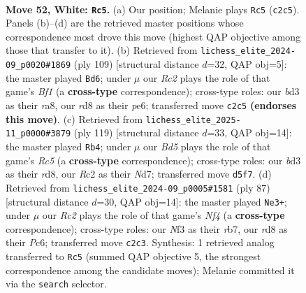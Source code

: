 \documentclass[11pt]{article}
\begin{document}
\clearpage

\begin{figure}[p]\centering
\begin{subfigure}{0.46\textwidth}\centering
\resizebox{\linewidth}{!}{%
\newchessgame
\chessboard[
  setfen={3r4/k7/8/3B1p1N/1P6/3b1N2/2R3P1/2K5 w - - 0 52},
  showmover=false,
  pgfstyle=straightmove, color=movearrow, markmove={c2-c5}
]}
\caption{}
\end{subfigure}\hfill
\begin{subfigure}{0.46\textwidth}\centering
\resizebox{\linewidth}{!}{%
\newchessgame
\chessboard[
  setfen={R4b2/2p3k1/4P3/3p4/4p1K1/3n4/8/8 b - - 0 55},
  showmover=false,
  pgfstyle=straightmove, color=movearrow, markmove={f8-d6}
]}
\caption{}
\end{subfigure}
\\[4pt]
\begin{subfigure}{0.46\textwidth}\centering
\resizebox{\linewidth}{!}{%
\newchessgame
\chessboard[
  setfen={3R4/3n3p/2k5/5P2/p1r3P1/4B2P/8/6K1 b - - 0 60},
  showmover=false,
  pgfstyle=straightmove, color=movearrow, markmove={c4-b4}
]}
\caption{}
\end{subfigure}\hfill
\begin{subfigure}{0.46\textwidth}\centering
\resizebox{\linewidth}{!}{%
\newchessgame
\chessboard[
  setfen={8/pR6/2p4r/4kn2/6B1/P7/6K1/8 b - - 2 44},
  showmover=false,
  pgfstyle=straightmove, color=movearrow, markmove={f5-e3}
]}
\caption{}
\end{subfigure}
\caption{\textbf{Move 52, White: \texttt{Rc5}.} (a) Our position; Melanie plays \texttt{Rc5} (\texttt{c2c5}). Panels (b)--(d) are the retrieved master positions whose correspondence most drove this move (highest QAP objective among those that transfer to it). (b) Retrieved from \texttt{lichess\_elite\_2024-09\_p0020\#1869} (ply 109) [structural distance $d$=32, QAP obj=5]: the master played \texttt{Bd6}; under $\mu$ our \emph{Rc2} plays the role of that game's \emph{Bf1} (a \textbf{cross-type} correspondence); cross-type roles: our \emph{b}d3 as their \emph{r}a8, our \emph{r}d8 as their \emph{p}e6; transferred move \texttt{c2c5} \textbf{(endorses this move)}. (c) Retrieved from \texttt{lichess\_elite\_2025-11\_p0000\#3879} (ply 119) [structural distance $d$=33, QAP obj=14]: the master played \texttt{Rb4}; under $\mu$ our \emph{Bd5} plays the role of that game's \emph{Rc5} (a \textbf{cross-type} correspondence); cross-type roles: our \emph{b}d3 as their \emph{r}d8, our \emph{R}c2 as their \emph{N}d7; transferred move \texttt{d5f7}. (d) Retrieved from \texttt{lichess\_elite\_2024-09\_p0005\#1581} (ply 87) [structural distance $d$=30, QAP obj=14]: the master played \texttt{Ne3+}; under $\mu$ our \emph{Rc2} plays the role of that game's \emph{Nf4} (a \textbf{cross-type} correspondence); cross-type roles: our \emph{N}f3 as their \emph{r}b7, our \emph{r}d8 as their \emph{P}c6; transferred move \texttt{c2c3}. Synthesis: 1 retrieved analog transferred to \texttt{Rc5} (summed QAP objective 5, the strongest correspondence among the candidate moves); Melanie committed it via the \texttt{search} selector.}
\label{fig:thought-m102}
\end{figure}
\end{document}
